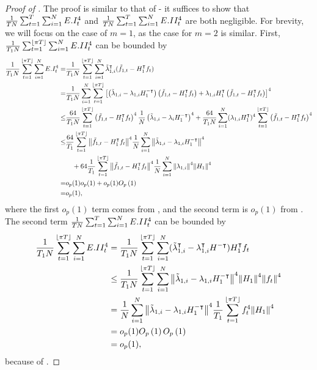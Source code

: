 \documentclass[12pt]{article}
\newcommand*{\tran}{\intercal}
\theoremstyle{plain}
\numberwithin{equation}{section}
\begin{document}
\begin{proof}[Proof of ]
The proof is similar to that of  - it suffices to show that $\frac{1}{TN} \sum_{t = 1}^{T} \sum_{i = 1}^{N} E.I_t^4$ and $\frac{1}{TN} \sum_{t = 1}^{T} \sum_{i = 1}^{N} E.II_t^4$ are both negligible. For brevity, we will focus on the case of $m = 1$, as the case for $m = 2$ is similar. First, $\frac{1}{T_1 N} \sum_{t = 1}^{\left \lfloor \pi T \right \rfloor} \sum_{i = 1}^{N} E.II_t^4$ can be bounded by 
\begin{align*}
\frac{1}{T_1 N} \sumTfloor \sumN E.I_t^4 = 
&\frac{1}{T_1 N} \sumTfloor \sumN \tilde{\lambda}_{1, i}^\tran (\tilde{f}_{1, t} - H_1^\tran f_{t}) \\
= & \frac{1}{T_1 N} \sumN \sumTfloor 
\left[ 
	\left( \tilde{\lambda}_{1, i} - \lambda_{1, i} H_1^{-\tran}\right) \left( \tilde{f}_{1, t} - H_1^\tran f_{t}\right) + 
	\lambda_{1, i} H_1^\tran \left( \tilde{f}_{1, t} - H_1^\tran f_{t}\right)  
\right]^4 \\
\leq &\frac{64}{T_1 N} \sumTfloor \left( \tilde{f}_{1, t} - H_1^\tran f_{t}\right)^4
\fracN \left( \tilde{\lambda}_{1, i} - \lambda_i H_1^{-\tran}\right)^4+
\frac{64}{T_1 N} \sumN (\lambda_{1, i} H_1^\tran)^4 \sumTfloor \left( \tilde{f}_{1, t} - H_1^\tran f_{t}\right)^4  \\
\leq &\frac{64}{T_1} \sumTfloor \norm{\tilde{f}_{1, t} - H_1^\tran f_{t}}^4 \fracN \sumN \norm{\tilde{\lambda}_{1, i} - \lambda_{1, i} H_1^{-\tran}}^4 \\
&\quad + 64 \fracTone \sumTfloor \norm{\tilde{f}_{1, t} - H_1^\tran f_{t}}^4
\fracN \sumN \norm{\lambda_{1, i}}^4 \norm{H_1}^4 \\
= &o_p(1) o_p(1) + o_p(1) \Op{1} \\
= &o_p(1),
\end{align*}
where the first $o_p(1)$ term comes from , and the second term is $o_p(1)$ from .
The second term $\frac{1}{TN} \sum_{t = 1}^{T} \sum_{i = 1}^{N} E.II_t^4$ can be bounded by
\begin{align*}
\frac{1}{T_1 N} \sumTfloor \sumN E.II_t^4 &= 
\frac{1}{T_1 N} \sumTfloor \sumN (\tilde{\lambda}_{1, i}^\tran - \lambda_{1, i}^\tran H^{- \tran}) H_1^\tran f_{t} \\
&\leq 
\frac{1}{T_1 N} \sumTfloor \sumN \norm{\tilde{\lambda}_{1, i} - \lambda_{1, i} H_1^{-\tran}}^4 
\norm{H_1}^4 \norm{f_{t}}^4 \\
&= \fracN \sumN \norm{\tilde{\lambda}_{1, i} - \lambda_{1, i} H_1^{-\tran}}^4 \fracTone \sumTfloor f_{t}^4 \norm{H_1}^4 \\
&= o_p(1) \Op{1} \Op{1} \\
&= o_p(1),
\end{align*}
because of .
\end{proof}
\end{document}
